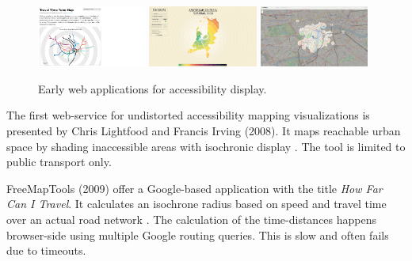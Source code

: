     \begin{figure}[t]
      {\includegraphics[width=0.32\textwidth]{./img/overv-tttub.png}}
      \hfill
      {\includegraphics[width=0.32\textwidth]{./img/overv-timem.png}}
      \hfill
      {\includegraphics[width=0.32\textwidth]{./img/overv-mapnf.png}}
      \caption{Early web applications for accessibility display.}
      \label{fig:overv:3}
    \end{figure}

    The first web-service for undistorted accessibility mapping visualizations
    is presented by Chris Lightfood and Francis Irving (2008)\cite{Mapumental}.
    It maps reachable urban space by shading inaccessible areas with isochronic
    display \cite{Lightfoot2006,Irving2007}. The tool is limited to public
    transport only.\par

    FreeMapTools (2009) offer a Google-based application with the title
    \textit{How Far Can I Travel}. It calculates an isochrone radius based on
    speed and travel time over an actual road network \cite{Freemaptools}. The
    calculation of the time-distances happens browser-side using multiple Google
    routing queries. This is slow and often fails due to timeouts.\par

